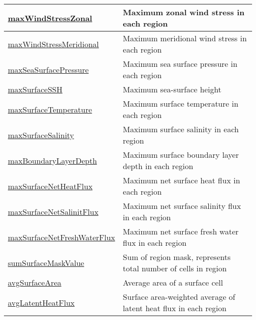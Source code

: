 {\begin{center}
\begin{longtable}{| p{2.0in} | p{4.0in} |}
    \hline
    \hyperref[subsec:var_sec_surfaceAreaWeightedAveragesAM_maxWindStressZonal]{maxWindStressZonal} & Maximum zonal wind stress in each region \\
    \hline
    \hyperref[subsec:var_sec_surfaceAreaWeightedAveragesAM_maxWindStressMeridional]{maxWindStressMeridional} & Maximum meridional wind stress in each region \\
    \hline
    \hyperref[subsec:var_sec_surfaceAreaWeightedAveragesAM_maxSeaSurfacePressure]{maxSeaSurfacePressure} & Maximum sea surface pressure in each region \\
    \hline
    \hyperref[subsec:var_sec_surfaceAreaWeightedAveragesAM_maxSurfaceSSH]{maxSurfaceSSH} & Maximum sea-surface height \\
    \hline
    \hyperref[subsec:var_sec_surfaceAreaWeightedAveragesAM_maxSurfaceTemperature]{maxSurfaceTemperature} & Maximum surface temperature in each region \\
    \hline
    \hyperref[subsec:var_sec_surfaceAreaWeightedAveragesAM_maxSurfaceSalinity]{maxSurfaceSalinity} & Maximum surface salinity in each region \\
    \hline
    \hyperref[subsec:var_sec_surfaceAreaWeightedAveragesAM_maxBoundaryLayerDepth]{maxBoundaryLayerDepth} & Maximum surface boundary layer depth in each region \\
    \hline
    \hyperref[subsec:var_sec_surfaceAreaWeightedAveragesAM_maxSurfaceNetHeatFlux]{maxSurfaceNetHeatFlux} & Maximum net surface heat flux in each region \\
    \hline
    \hyperref[subsec:var_sec_surfaceAreaWeightedAveragesAM_maxSurfaceNetSalinitFlux]{maxSurfaceNetSalinitFlux} & Maximum net surface salinity flux in each region \\
    \hline
    \hyperref[subsec:var_sec_surfaceAreaWeightedAveragesAM_maxSurfaceNetFreshWaterFlux]{maxSurfaceNetFreshWaterFlux} & Maximum net surface fresh water flux in each region \\
    \hline
    \hyperref[subsec:var_sec_surfaceAreaWeightedAveragesAM_sumSurfaceMaskValue]{sumSurfaceMaskValue} & Sum of region mask, represents total number of cells in region \\
    \hline
    \hyperref[subsec:var_sec_surfaceAreaWeightedAveragesAM_avgSurfaceArea]{avgSurfaceArea} & Average area of a surface cell \\
    \hline
    \hyperref[subsec:var_sec_surfaceAreaWeightedAveragesAM_avgLatentHeatFlux]{avgLatentHeatFlux} & Surface area-weighted average of latent heat flux in each region \\

\end{longtable}
\end{center}}
